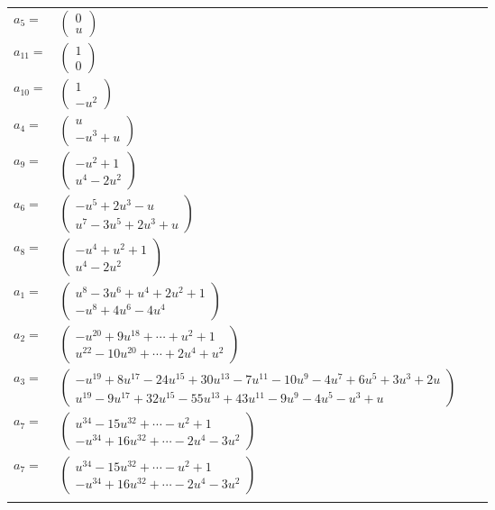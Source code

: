 \documentclass[1p]{elsarticle_modified}
\theoremstyle{definition}
\begin{document}
\begin{tabular}{m{7pt} m{180pt} m{7pt} m{180pt} }
\flushright $a_{5}=$&$\begin{pmatrix}0\\u\end{pmatrix}$ \\
\flushright $a_{11}=$&$\begin{pmatrix}1\\0\end{pmatrix}$ \\
\flushright $a_{10}=$&$\begin{pmatrix}1\\- u^2\end{pmatrix}$ \\
\flushright $a_{4}=$&$\begin{pmatrix}u\\- u^3+u\end{pmatrix}$ \\
\flushright $a_{9}=$&$\begin{pmatrix}- u^2+1\\u^4-2 u^2\end{pmatrix}$ \\
\flushright $a_{6}=$&$\begin{pmatrix}- u^5+2 u^3- u\\u^7-3 u^5+2 u^3+u\end{pmatrix}$ \\
\flushright $a_{8}=$&$\begin{pmatrix}- u^4+u^2+1\\u^4-2 u^2\end{pmatrix}$ \\
\flushright $a_{1}=$&$\begin{pmatrix}u^8-3 u^6+u^4+2 u^2+1\\- u^8+4 u^6-4 u^4\end{pmatrix}$ \\
\flushright $a_{2}=$&$\begin{pmatrix}- u^{20}+9 u^{18}+\cdots+u^2+1\\u^{22}-10 u^{20}+\cdots+2 u^4+u^2\end{pmatrix}$ \\
\flushright $a_{3}=$&$\begin{pmatrix}- u^{19}+8 u^{17}-24 u^{15}+30 u^{13}-7 u^{11}-10 u^9-4 u^7+6 u^5+3 u^3+2 u\\u^{19}-9 u^{17}+32 u^{15}-55 u^{13}+43 u^{11}-9 u^9-4 u^5- u^3+u\end{pmatrix}$ \\
\flushright $a_{7}=$&$\begin{pmatrix}u^{34}-15 u^{32}+\cdots- u^2+1\\- u^{34}+16 u^{32}+\cdots-2 u^4-3 u^2\end{pmatrix}$\\ \flushright $a_{7}=$&$\begin{pmatrix}u^{34}-15 u^{32}+\cdots- u^2+1\\- u^{34}+16 u^{32}+\cdots-2 u^4-3 u^2\end{pmatrix}$\\&\end{tabular}
\end{document}
